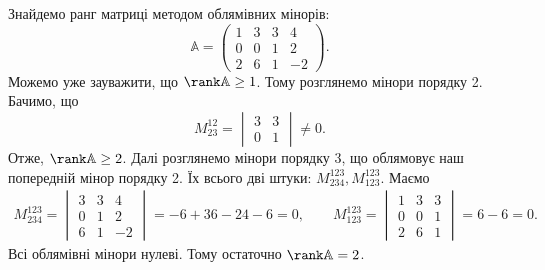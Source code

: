 \documentclass{math_library}
\begin{document}
\begin{example}
Знайдемо ранг матриці методом облямівних мінорів:
\[
\mathbb{A} = \begin{pmatrix}
1 & 3 & 3 & 4 \\
0 & 0 & 1 & 2 \\
2 & 6 & 1 & -2
\end{pmatrix}.
\]
Можемо уже зауважити, що $\rank \mathbb{A} \geq 1$. Тому розглянемо мінори порядку 2. Бачимо, що
\[ 
M^{12}_{23} = \begin{vmatrix}
3 & 3 \\
0 & 1
\end{vmatrix} \neq 0.
\]
Отже, $\rank \mathbb{A} \geq 2$. Далі розглянемо мінори порядку 3, що облямовує наш попередній мінор порядку 2. Їх всього дві штуки: $M^{123}_{234},M^{123}_{123}$. Маємо
\begin{align*}
M^{123}_{234} = \begin{vmatrix}
3 & 3 & 4 \\
0 & 1 & 2 \\
6 & 1 & -2
\end{vmatrix} = -6+36-24-6 = 0, \qquad M^{123}_{123} = \begin{vmatrix}
1 & 3 & 3 \\
0 & 0 & 1 \\
2 & 6 & 1
\end{vmatrix} = 6 - 6 = 0.
\end{align*}
Всі облямівні мінори нулеві. Тому остаточно $\rank \mathbb{A} = 2$.
\end{example}
\end{document}
